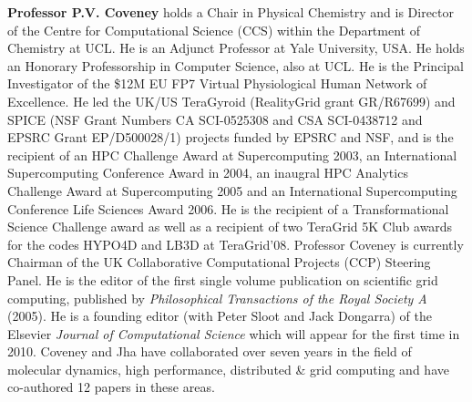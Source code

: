
\textbf{Professor P.V. Coveney} holds a Chair in Physical Chemistry and is Director of the Centre for Computational Science (CCS) within the Department of Chemistry at UCL. He is an Adjunct Professor at Yale University, USA. He holds an Honorary Professorship in Computer Science, also at UCL. He is the Principal Investigator of the \$12M EU FP7 Virtual Physiological Human Network of Excellence. He led the UK/US TeraGyroid (RealityGrid grant GR/R67699) and SPICE (NSF Grant Numbers CA SCI-0525308 and CSA SCI-0438712 and EPSRC Grant EP/D500028/1) projects funded by EPSRC and NSF, and is the recipient of an HPC Challenge Award at Supercomputing 2003, an International Supercomputing Conference Award in 2004, an inaugral HPC Analytics Challenge Award at Supercomputing 2005 and an International Supercomputing Conference Life Sciences Award 2006. He is the recipient of a Transformational Science Challenge award as well as a recipient of two TeraGrid 5K Club awards for the codes HYPO4D and LB3D at TeraGrid'08. Professor Coveney is currently Chairman of the UK Collaborative Computational Projects (CCP) Steering Panel. He is the editor of the first single volume publication on scientific grid computing, published by \emph{Philosophical Transactions of the Royal Society A} (2005). He is a founding editor (with Peter Sloot and Jack Dongarra) of the Elsevier \emph{Journal of Computational Science} which will appear for the first time in 2010. Coveney and Jha have collaborated over seven years in the field of molecular dynamics, high performance, distributed \& grid computing and have co-authored 12 papers in these areas.



